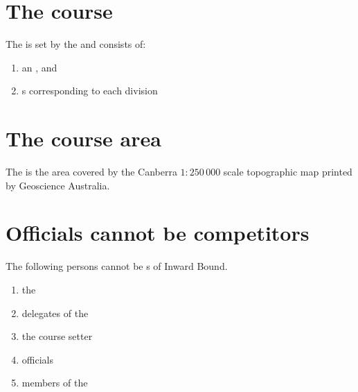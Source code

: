\documentclass[12pt]{report}
\begin{document}
\section{The course}
  \begin{fenumerate}
  \item The  is set by the  and consists of:
  \begin{enumerate}
    \item an \Endpoint, and
    \item \dropoffpoint s corresponding to each division
  \end{enumerate}
  \end{fenumerate}
  \section{The course area}
  \begin{fenumerate}
    \item The  is the area covered by the Canberra $1:250\,000$ scale topographic map printed by Geoscience Australia.
  \end{fenumerate}
\section{Officials cannot be competitors}
\begin{fenumerate}
  \item The following persons cannot be \competitor s of Inward Bound.
  \begin{enumerate}
    \item the \RaceDirector
    \item delegates of the \RaceDirector
    \item the course setter
    \item officials
    \item members  of the \Tribunal
  \end{enumerate}
\end{fenumerate}
\end{document}
